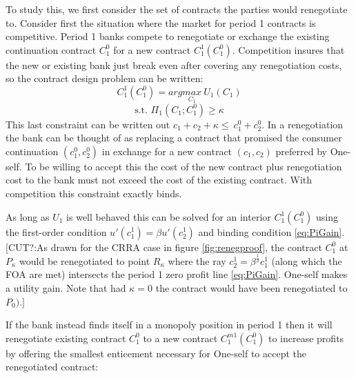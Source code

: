 \documentclass[11pt,english]{article}
\theoremstyle{plain}
\theoremstyle{definition}
\begin{document}
To study this, we first consider the set of contracts the parties would renegotiate to.  Consider first the situation where the market for period 1 contracts
is competitive.  
Period 1 banks compete to renegotiate
or exchange the existing continuation contract $C_{1}^{0}$ for a new contract
$C_{1}^{1}(C_{1}^{0})$. Competition insures that the new or existing bank just
break even after covering any renegotiation costs, so the contract design problem can be written: 
\begin{equation}
C_{1}^{1}(C_{1}^{0})=arg\underset{C_{1}}{max}\ U_{1}(C_{1})
\end{equation}
\begin{equation}
\text{s.t. }\Pi_{1}(C_{1};C_{1}^{0})\ge\kappa\label{eq:PiGain}
\end{equation}
This last constraint can be written out \(c_1+c_2+\kappa \le\ c_1^0+c_2^0 \). In a renegotiation the bank can be thought of as  replacing a contract that promised the consumer continuation $(c_1^0,c_2^0)$ in exchange for a new contract $(c_1,c_2)$ preferred by One-self. To be willing to accept this the cost of the new contract plus renegotiation cost to the bank must not exceed the cost of the existing contract.
 With competition this constraint exactly binds.
 
As long as $U_{1}$ is well behaved this can be solved for
an interior $C_{1}^{1}(C_{1}^{0})$ using the first-order condition
$u'(c_{1}^{1})=\beta u'(c_{2}^{1})$ and binding condition \ref{eq:PiGain}.
[CUT?:As drawn for the CRRA case in figure \ref{fig:renegproof}, the contract $C_{1}^{0}$
at $P_{\kappa}$ would be renegotiated to point $R_{\kappa}$ where the ray 
$c_{2}^{1}=\beta^{\frac{1}{\rho}}c_{1}^{1}$
(along which the FOA are met) intersects the period 1 zero profit
line \ref{eq:PiGain}. One-self makes a utility gain. Note that had
$\kappa=0$ the contract would have been renegotiated to $P_{0}).]$

If the bank instead finds itself in a monopoly position in period
1 then it will renegotiate existing contract $C_{1}^{0}$ to a new
contract $C_{1}^{m1}(C_{1}^{0})$ to increase profits by offering
the smallest enticement necessary for One-self to accept the renegotiated
contract:
\end{document}
